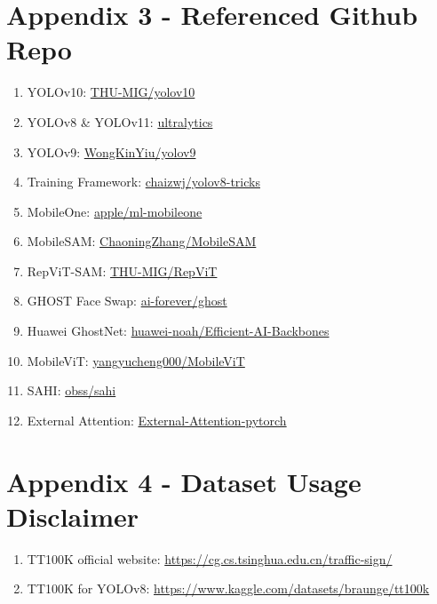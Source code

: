 \documentclass[10pt]{article}
\begin{document}
\section{Appendix 3 - Referenced Github Repo}
\begin{enumerate}
    \item YOLOv10: \href{https://github.com/THU-MIG/yolov10}{THU-MIG/yolov10}
    \item YOLOv8 \& YOLOv11: \href{https://github.com/ultralytics/ultralytics}{ultralytics}
    \item YOLOv9: \href{https://github.com/WongKinYiu/yolov9}{WongKinYiu/yolov9}
    \item Training Framework: \href{https://github.com/chaizwj/yolov8-tricks}{chaizwj/yolov8-tricks}
    \item MobileOne: \href{https://github.com/apple/ml-mobileone}{apple/ml-mobileone}
    \item MobileSAM: \href{https://github.com/ChaoningZhang/MobileSAM}{ChaoningZhang/MobileSAM}
    \item RepViT-SAM: \href{https://github.com/THU-MIG/RepViT}{THU-MIG/RepViT}
    \item GHOST Face Swap: \href{https://github.com/ai-forever/ghost}{ai-forever/ghost}
    \item Huawei GhostNet: \href{https://github.com/huawei-noah/Efficient-AI-Backbones}{huawei-noah/Efficient-AI-Backbones}
    \item MobileViT: \href{https://github.com/yangyucheng000/MobileViT}{yangyucheng000/MobileViT}
    \item SAHI: \href{https://github.com/obss/sahi}{obss/sahi}
    \item External Attention: \href{https://github.com/xmu-xiaoma666/External-Attention-pytorch}{External-Attention-pytorch}
\end{enumerate}
\newpage
\section{Appendix 4 - Dataset Usage Disclaimer}
\begin{enumerate}
    \item TT100K official website: \href{https://cg.cs.tsinghua.edu.cn/traffic-sign/}{https://cg.cs.tsinghua.edu.cn/traffic-sign/}
    \item TT100K for YOLOv8: \href{https://www.kaggle.com/datasets/braunge/tt100k}{https://www.kaggle.com/datasets/braunge/tt100k}
\end{enumerate}
\end{document}
